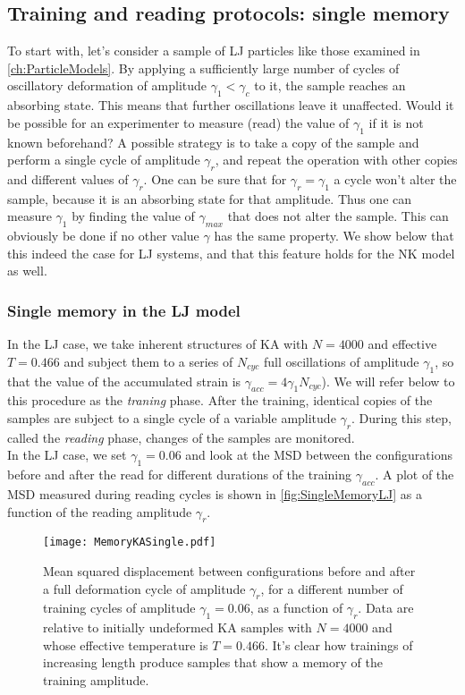 \subsection{Training and reading protocols: single memory}

To start with, let's consider a sample of LJ particles like those examined in \autoref{ch:ParticleModels}. 
By applying a sufficiently large number of cycles of oscillatory deformation of amplitude $\gamma_{1} < \gamma_{c}$ to it, the sample reaches an absorbing state. This means that further oscillations leave it unaffected.
Would it be possible for an experimenter to measure (read) the value of $\gamma_{1}$ if it is not known beforehand?
A possible strategy is to take a copy of the sample and perform a single cycle of amplitude $\gamma_{r}$, and repeat the operation with other copies and different values of $\gamma_{r}$. One can be sure that for $\gamma_{r} = \gamma_{1}$ a cycle won't alter the sample, because it is an absorbing state for that amplitude. Thus one can measure $\gamma_{1}$ by finding the value of $\gamma_{max}$ that does not alter the sample. This can obviously be done if no other value $\gamma$ has the same property. We show below that this indeed the case for LJ systems, and that this feature holds for the NK model as well.

\subsubsection{Single memory in the LJ model}

In the LJ case, we take inherent structures of KA with $N=4000$ and effective $T=0.466$ and subject them to a series of $N_{cyc}$ full oscillations of amplitude $\gamma_{1}$, so that the value of the accumulated strain is $\gamma_{acc} = 4\gamma_{1} N_{cyc}$). We will refer below to this procedure as the \emph{traning} phase. After the training, identical copies of the samples are subject to a single cycle of a variable amplitude $\gamma_{r}$. During this step, called the \emph{reading} phase, changes of the samples are monitored. \\
In the LJ case, we set $\gamma_{1} = 0.06$ and look at the MSD between the configurations before and after the read for different durations of the training $\gamma_{acc}$. A plot of the MSD measured during reading cycles is shown in \autoref{fig:SingleMemoryLJ} as a function of the reading amplitude $\gamma_{r}$.

\begin{figure} 
\centering 
\texttt{[image: MemoryKASingle.pdf]} 
\caption{Mean squared displacement between configurations before and after a full deformation cycle of amplitude $\gamma_{r}$, for a different number of training cycles of amplitude $\gamma_{1} = 0.06$, as a function of $\gamma_{r}$. Data are relative to initially undeformed KA samples with $N=4000$ and whose effective temperature is $T=0.466$. It's clear how trainings of increasing length produce samples that show a memory of the training amplitude. \label{fig:SingleMemoryLJ}}
\end{figure}

